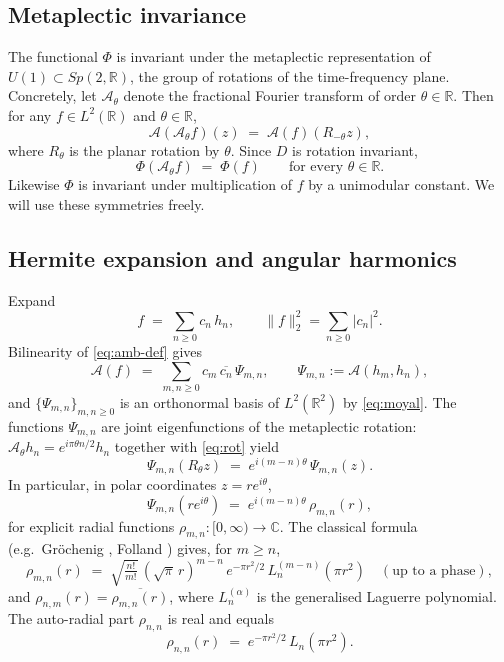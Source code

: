 \documentclass[11pt]{article}
\theoremstyle{definition}
\newcommand{\C}{\mathbb{C}}
\newcommand{\R}{\mathbb{R}}
\newcommand{\Amb}{\mathcal{A}}
\newcommand{\norm}[1]{\lVert#1\rVert}
\begin{document}
\subsection{Metaplectic invariance}

The functional $\Phi$ is invariant under the metaplectic representation of
$U(1)\subset Sp(2,\R)$, the group of rotations of the time-frequency plane.
Concretely, let $\Amb_\theta$ denote the fractional Fourier transform of order
$\theta\in\R$.  Then for any $f\in L^{2}(\R)$ and $\theta\in\R$,
\begin{equation}\label{eq:rot}
  \Amb(\Amb_\theta f)(z) \;=\; \Amb(f)(R_{-\theta}z),
\end{equation}
where $R_{\theta}$ is the planar rotation by $\theta$.  Since $D$ is rotation
invariant,
\[
  \Phi(\Amb_\theta f) \;=\; \Phi(f) \qquad \text{for every }\theta\in\R.
\]
Likewise $\Phi$ is invariant under multiplication of $f$ by a unimodular
constant.  We will use these symmetries freely.

\subsection{Hermite expansion and angular harmonics}\label{sec:hermite}

Expand
\[
  f \;=\; \sum_{n\ge 0} c_{n}\,h_{n},
  \qquad
  \norm{f}_{2}^{2}=\sum_{n\ge 0}|c_{n}|^{2}.
\]
Bilinearity of \eqref{eq:amb-def} gives
\begin{equation}\label{eq:amb-expand}
  \Amb(f) \;=\; \sum_{m,n\ge 0} c_{m}\,\overline{c_{n}}\,\Psi_{m,n},
  \qquad \Psi_{m,n}:=\Amb(h_{m},h_{n}),
\end{equation}
and $\{\Psi_{m,n}\}_{m,n\ge 0}$ is an orthonormal basis of $L^{2}(\R^{2})$ by
\eqref{eq:moyal}.  The functions $\Psi_{m,n}$ are joint eigenfunctions of the
metaplectic rotation: $\Amb_{\theta}h_{n}=e^{i\pi\theta n/2}h_{n}$ together with
\eqref{eq:rot} yield
\begin{equation}\label{eq:rot-eigen}
  \Psi_{m,n}(R_{\theta}z) \;=\; e^{i(m-n)\theta}\,\Psi_{m,n}(z).
\end{equation}
In particular, in polar coordinates $z=re^{i\theta}$,
\begin{equation}\label{eq:polar}
  \Psi_{m,n}(re^{i\theta})\;=\;e^{i(m-n)\theta}\,\rho_{m,n}(r),
\end{equation}
for explicit radial functions $\rho_{m,n}\colon[0,\infty)\to\C$.  The
classical formula (e.g.\ Gr\"ochenig \cite[Ch.~1.6]{Grochenig}, Folland
\cite[\S 1.9]{Folland}) gives, for $m\ge n$,
\begin{equation}\label{eq:psi-formula}
  \rho_{m,n}(r)
  \;=\; \sqrt{\tfrac{n!}{m!}}\,(\sqrt{\pi}\,r)^{m-n}\,
        e^{-\pi r^{2}/2}\,L_{n}^{(m-n)}(\pi r^{2})\quad(\text{up to a phase}),
\end{equation}
and $\rho_{n,m}(r)=\overline{\rho_{m,n}(r)}$, where $L_{n}^{(\alpha)}$ is the
generalised Laguerre polynomial.  The auto-radial part $\rho_{n,n}$ is real
and equals
\begin{equation}\label{eq:auto-radial}
  \rho_{n,n}(r) \;=\; e^{-\pi r^{2}/2}\,L_{n}(\pi r^{2}).
\end{equation}
\end{document}
